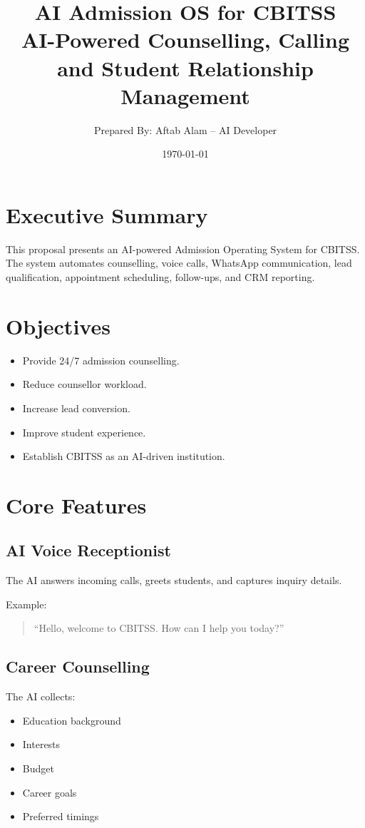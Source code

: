 \documentclass[11pt,a4paper]{article}
\title{AI Admission OS for CBITSS\\
\large AI-Powered Counselling, Calling and Student Relationship Management}
\author{Prepared By: Aftab Alam -- AI Developer}
\date{\today}
\begin{document}
\maketitle
\tableofcontents
\newpage

\section{Executive Summary}
This proposal presents an AI-powered Admission Operating System for CBITSS.
The system automates counselling, voice calls, WhatsApp communication,
lead qualification, appointment scheduling, follow-ups, and CRM reporting.

\section{Objectives}
\begin{itemize}
\item Provide 24/7 admission counselling.
\item Reduce counsellor workload.
\item Increase lead conversion.
\item Improve student experience.
\item Establish CBITSS as an AI-driven institution.
\end{itemize}

\section{Core Features}

\subsection{AI Voice Receptionist}
The AI answers incoming calls, greets students, and captures inquiry details.

Example:
\begin{quote}
``Hello, welcome to CBITSS. How can I help you today?''
\end{quote}

\subsection{Career Counselling}
The AI collects:
\begin{itemize}
\item Education background
\item Interests
\item Budget
\item Career goals
\item Preferred timings
\end{itemize}
\end{document}
